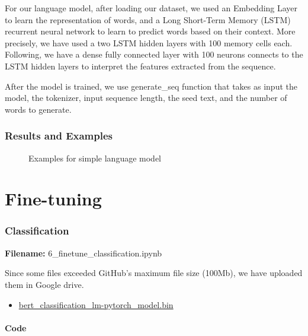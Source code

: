 \documentclass[12pt, a4paper]{article}
\begin{document}
For our language model, after loading our dataset, we used an Embedding Layer to learn the representation of words, and a Long Short-Term Memory (LSTM) recurrent neural network to learn to predict words based on their context. More precisely, we have used a two LSTM hidden layers with 100 memory cells each. Following, we have a dense fully connected layer with 100 neurons connects to the LSTM hidden layers to interpret the features extracted from the sequence.

After the model is trained, we use generate\_seq function that takes as input the model, the tokenizer, input sequence length, the seed text, and the number of words to generate. 

\section*{Results and Examples}

\begin{figure}[H]
	\caption{Examples for simple language model}
	\label{normal-lm_examples}
\end{figure}


\newpage
\part{Fine-tuning}

\section*{Classification}
\large{\textbf{Filename:} 6\_finetune\_classification.ipynb}

Since some files exceeded GitHub's maximum file size (100Mb), we have uploaded them in Google drive.
\begin{itemize}
	\item \href{https://drive.google.com/file/d/1Lbbhh2N92k3IjuZ5TObauPd2en5qAT6i/view?usp=sharing}{bert\_classification\_lm-pytorch\_model.bin}
\end{itemize}

\subsection*{Code}
\end{document}
